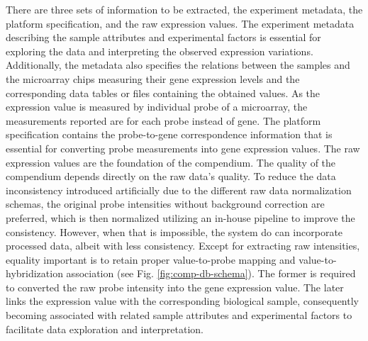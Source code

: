 There are three sets of information to be extracted, the experiment
metadata, the platform specification, and the raw expression values.
%
%
The experiment metadata describing the sample attributes and experimental
factors is essential for exploring the data and interpreting the observed
expression variations.
%
Additionally, the metadata also specifies the relations between the samples and 
the microarray chips measuring their gene expression levels and the 
corresponding data tables or files containing the obtained values.
%
As the expression value is measured by individual probe of a microarray, the
measurements reported are for each probe instead of gene.
%
The platform specification contains the probe-to-gene correspondence
information that is essential for converting probe measurements into gene
expression values.
%
%
The raw expression values are the foundation of the compendium.  The quality of
the compendium depends directly on the raw data's quality.
%
To reduce the data inconsistency introduced artificially due to the different
raw data normalization schemas, the original probe intensities without
background correction are preferred, which is then normalized utilizing an
in-house pipeline to improve the consistency.
%
However, when that is impossible, the 
system do can incorporate processed data, albeit with less consistency.
%
%
Except for extracting raw intensities, equality important is to retain proper
value-to-probe mapping and value-to-hybridization association
(see Fig. \ref{fig:comp-db-schema}).
%
The former is required to converted the raw probe intensity into the gene
expression value.
%
The later links the expression value with the corresponding biological sample,
consequently becoming associated with related sample attributes and
experimental factors to facilitate data exploration and interpretation.

